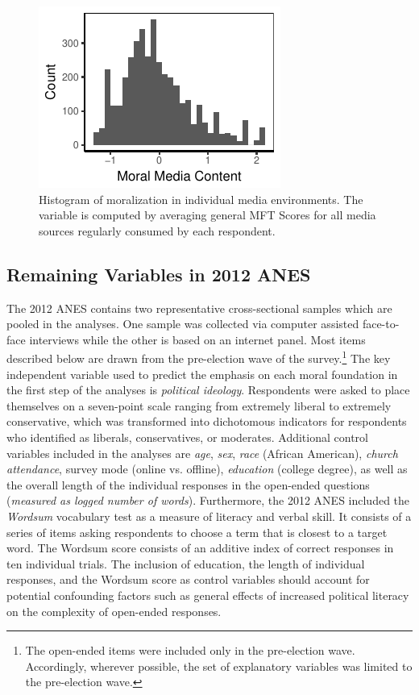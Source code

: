 \documentclass[12pt]{article}
\begin{document}
\begin{figure}[ht]\centering
\includegraphics{../calc/fig/app_moralmedia.pdf}
\caption{Histogram of moralization in individual media environments. The variable is computed by averaging general MFT Scores for all media sources regularly consumed by each respondent.}\label{fig:moralmedia}
\end{figure}


\clearpage
\subsection{Remaining Variables in 2012 ANES}

The 2012 ANES contains two representative cross-sectional samples which are pooled in the analyses. One sample was collected via computer assisted face-to-face interviews while the other is based on an internet panel. Most items described below are drawn from the pre-election wave of the survey.\footnote{The open-ended items were included only in the pre-election wave. Accordingly, wherever possible, the set of explanatory variables was limited to the pre-election wave.} The key independent variable used to predict the emphasis on each moral foundation in the first step of the analyses is \textit{political ideology}. Respondents were asked to place themselves on a seven-point scale ranging from extremely liberal to extremely conservative, which was transformed into dichotomous indicators for respondents who identified as liberals, conservatives, or moderates. Additional control variables included in the analyses are \textit{age}, \textit{sex}, \textit{race} (African American), \textit{church attendance}, survey mode (online vs. offline), \textit{education} (college degree), as well as the overall length of the individual responses in the open-ended questions (\textit{measured as logged number of words}). Furthermore, the 2012 ANES included the \textit{Wordsum} vocabulary test as a measure of literacy and verbal skill. It consists of a series of items asking respondents to choose a term that is closest to a target word. The Wordsum score consists of an additive index of correct responses in ten individual trials. The inclusion of education, the length of individual responses, and the Wordsum score as control variables should account for potential confounding factors such as general effects of increased political literacy on the complexity of open-ended responses.
\end{document}
